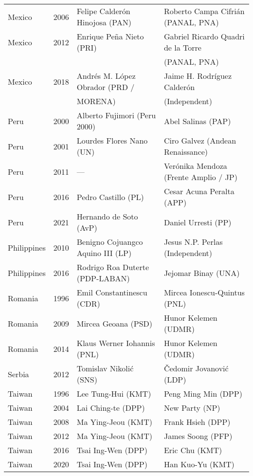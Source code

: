 {\begin{longtable}{|l|c|l|l|}
 Mexico     & 2006 &  Felipe Calder\'on Hinojosa (PAN)   &  Roberto Campa Cifri\'an (PANAL, PNA) \\ 
 Mexico     & 2012 &   Enrique Pe\~na Nieto (PRI) & Gabriel Ricardo Quadri de la Torre   \\ 
             &  &    &   (PANAL, PNA) \\ 
 Mexico     & 2018 & Andr\'es M. L\'opez Obrador (PRD /   &  Jaime H. Rodr\'iguez Calder\'on   \\ 
      &   &  MORENA) &    (Independent)  \\ 
 Peru     & 2000 & Alberto Fujimori (Peru 2000) & Abel Salinas (PAP)           \\ 
 Peru     & 2001 & Lourdes Flores Nano (UN)    &   Ciro Galvez (Andean Renaissance)      \\ 
 Peru     & 2011 &  --- &  Ver\'onika Mendoza (Frente Amplio / JP)    \\ 
 Peru     & 2016 & Pedro Castillo (PL) &   Cesar Acuna Peralta (APP)  \\ 
 Peru     & 2021 & Hernando de Soto (AvP) &   Daniel Urresti (PP)  \\ 
 Philippines     & 2010 &  Benigno Cojuangco Aquino III (LP)  &  Jesus N.P. Perlas (Independent) \\ 
 Philippines     & 2016 & Rodrigo Roa Duterte (PDP-LABAN)           &  Jejomar Binay (UNA)     \\ 
 Romania     & 1996 & Emil Constantinescu (CDR) & Mircea Ionescu-Quintus (PNL)             \\ 
 Romania & 2009 & Mircea Geoana (PSD) &   Hunor Kelemen (UDMR)  \\ 
 Romania & 2014 &   Klaus Werner Iohannis (PNL)    &   Hunor Kelemen (UDMR)    \\ 
 Serbia     & 2012 &   Tomislav Nikoli\'c (SNS)         &  \v{C}edomir Jovanovi\'c (LDP)     \\ 
 Taiwan     & 1996 &   Lee Tung-Hui (KMT)       &   Peng Ming Min (DPP)\\ 
 Taiwan & 2004 &   Lai Ching-te (DPP) &   New Party (NP)      \\ 
 Taiwan & 2008 &   Ma Ying-Jeou (KMT)       &   Frank Hsieh (DPP)  \\ 
 Taiwan     & 2012 &  Ma Ying-Jeou (KMT)      &   James Soong (PFP)      \\ 
 Taiwan     & 2016 &   Tsai Ing-Wen (DPP) &  Eric Chu  (KMT)        \\ 
 Taiwan     & 2020 &   Tsai Ing-Wen (DPP) &  Han Kuo-Yu (KMT)      \\ 

\end{longtable}}
